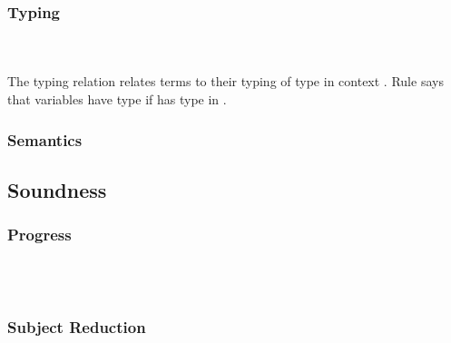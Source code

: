 \subsubsection{Typing}\hfill\\\\
The typing relation    \Data{:}  relates terms  to their typing of type    in context .
\FTyping
Rule  says that variables   have type  if  has type  in .

\subsubsection{Semantics}

\subsection{Soundness}
\subsubsection{Progress}\hfill\\\\
\subsubsection{Subject Reduction}

